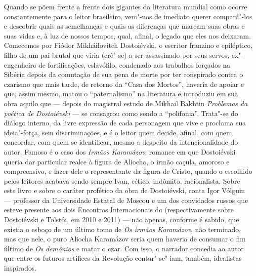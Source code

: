 {{Quando se põem frente a frente dois gigantes da literatura mundial como
ocorre constantemente para o leitor brasileiro, 
vem"-nos de imediato querer compará"-los e
descobrir quais as semelhanças e quais as diferenças que marcam suas
obras e suas vidas e, à luz de nossos tempos, qual, afinal, o legado que
eles nos deixaram. Comecemos por Fiódor Mikháilovitch Dostoiévski, o
escritor franzino e epiléptico, filho de um pai brutal que viria (crê"-se) a ser assassinado por seus servos, ex"-engenheiro de
fortificações, eslavófilo, condenado aos trabalhos forçados na Sibéria
depois da comutação de sua pena de morte por ter conspirado contra o
czarismo que mais tarde, de retorno da ``Casa dos Mortos'', haveria de
apoiar e que, assim mesmo, matou o ``paternalismo'' na literatura e
introduziu em sua obra aquilo que --- depois do magistral estudo de
Mikhail Bakhtin \emph{Problemas da poética de Dostoiévski} --- se consagrou como sendo a ``polifonia''.
Trata"-se do diálogo interno, da livre expressão de cada personagem que
vive e proclama sua ideia"-força, sem discriminações, e é o leitor quem
decide, afinal, com quem concordar, com quem se identificar, mesmo a
despeito da intencionalidade do autor. Famoso é o caso dos \emph{Irmãos
Karamázov}, romance em que Dostoiévski queria dar particular realce à
figura de Aliocha, o irmão caçula, amoroso e compreensivo, e fazer dele
o representante da figura de Cristo, quando o escolhido pelos leitores
acabava sendo sempre Ivan, cético, indômito, racionalista. Sobre este
livro e sobre o caráter profético da obra de Dostoiévski, conta Igor
Vólguin --- professor da Universidade Estatal de Moscou e um dos
convidados russos que esteve presente aos dois Encontros Internacionais do  (respectivamente sobre Dostoiévski e
Tolstói, em 2010 e 2011) --- não
apenas, conforme é sabido, que existia o esboço de um último tomo de
\emph{Os irmãos Karamázov}, não terminado, mas que nele, o puro
Aliocha Karamázov seria quem haveria de consumar o fim último de \emph{Os
demônios} e matar o czar. Com isso, o narrador concedia ao autor que
entre os futuros artífices da Revolução contar"-se"-iam, também,
idealistas inspirados.

}}
